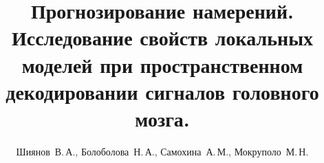 \documentclass[12pt,twoside]{article}
\title
    [Прогнозирование намерений]
    {Прогнозирование намерений. Исследование свойств локальных моделей при пространственном декодировании сигналов головного мозга.}
\author
    [Шиянов~В.\,А.]
    {Шиянов~В.\,А., Болоболова~Н.\,А., Самохина~А.\,М., Мокруполо~М.\,Н.}
\begin{document}
\maketitle
\bigskip
\bigskip
\bigskip
\bigskip
\bigskip
\maketitleSecondary
\end{document}
